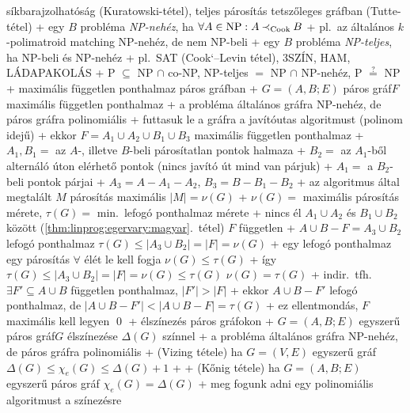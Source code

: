         síkbarajzolhatóság (Kuratowski-tétel), teljes párosítás
        tetszőleges gráfban (Tutte-tétel)
    + egy $B$ probléma \emph{NP-nehéz}, ha $\forall A \in
      \mathrm{NP}: A \mathbin{{\prec}_{\textrm{Cook}}} B$
      + pl.~az általános $k$-polimatroid matching NP-nehéz, de nem
        NP-beli
    + egy $B$ probléma \emph{NP-teljes}, ha NP-beli és NP-nehéz
      + pl.~SAT (Cook`--Levin tétel), 3SZÍN, HAM, LÁDAPAKOLÁS
  + P $\subseteq$ NP $\cap$ co-NP, NP-teljes $=$ NP $\cap$ NP-nehéz, P
    $\overset{?}{=}$ NP
+ \prob maximális független ponthalmaz páros gráfban
  + \DataIn $G = (A, B; E)$ páros gráf\qquad\DataOut $F$ maximális
    független ponthalmaz
  + a probléma általános gráfra NP-nehéz, de páros gráfra polinomiális
  + futtasuk le a gráfra a javítóutas algoritmust (polinom idejű)
  + \stmnt ekkor $F = A_1 \cup A_2 \cup B_1 \cup B_3$ maximális
    független ponthalmaz
    + $A_1, B_1 =$ az $A$-, illetve $B$-beli párosítatlan pontok
      halmaza
    + $B_2 =$ az $A_1$-ből alternáló úton elérhető pontok (nincs
      javító út \RA mind van párjuk)
    + $A_1 =$ a $B_2$-beli pontok párjai
    + $A_3 = A - A_1 - A_2$, $B_3 = B - B_1 - B_2$
    + \proof az algoritmus által megtalált $M$ párosítás maximális \RA%
      $\lvert M \rvert = \nu(G)$
      + $\nu(G) =$ maximális párosítás mérete, $\tau(G) =$ min.~lefogó
        ponthalmaz mérete
      + nincs él $A_1 \cup A_2$ és $B_1 \cup B_2$ között
        (\ref{thm:linprog:egervary:magyar}.~tétel) \RA $F$ független
      + $A \cup B - F = A_3 \cup B_2$ lefogó ponthalmaz \RA $\tau(G)
        \le \lvert A_3 \cup B_2 \rvert = \lvert F \rvert = \nu(G)$
      + egy lefogó ponthalmaz egy párosítás $\forall$ élét le kell
        fogja \RA $\nu(G) \le \tau(G)$
      + így $\tau(G) \le \lvert A_3 \cup B_2 \rvert = \lvert F \rvert
        = \nu(G) \le \tau(G)$ \RA $\nu(G) = \tau(G)$
    + indir.~tfh.~$\exists F' \subseteq A \cup B$ független
      ponthalmaz, $\lvert F' \rvert > \lvert F \rvert$
      + ekkor $A \cup B - F'$ lefogó ponthalmaz, de $\lvert A \cup B -
        F' \rvert < \lvert A \cup B - F \rvert = \tau(G)$
      + ez ellentmondás, $F$ maximális kell legyen \qed
+ \prob élszínezés páros gráfokon
  + \DataIn $G = (A, B; E)$ egyszerű páros gráf\qquad\DataOut $G$ élszínezése
    $\Delta(G)$ színnel
  + a probléma általános gráfra NP-nehéz, de páros gráfra polinomiális
  + \thm \label{thm:kozelito:additiv:vizing}(Vizing tétele) ha $G = (V, E)$ egyszerű gráf \RA $\Delta(G)
    \le \chi_e(G) \le \Delta(G) + 1$
    + \noproof
  + \thm (Kőnig tétele) ha $G = (A, B; E)$ egyszerű páros gráf \RA%
    $\chi_e(G) = \Delta(G)$
    + \proof meg fogunk adni egy polinomiális algoritmust a színezésre
